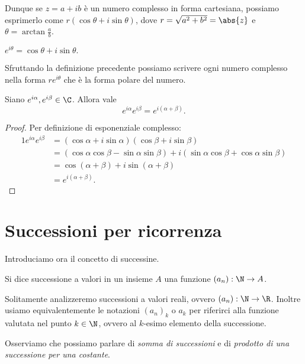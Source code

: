 Dunque se $z = a+ib$ è un numero complesso in forma cartesiana, possiamo esprimerlo come $r(\cos\theta + i\sin\theta)$, dove $r = \sqrt{a^2 + b^2} = \abs{z}$ e $\theta = \arctan \frac{a}{b}$.

\begin{definition}
    $e^{i\theta} = \cos\theta + i\sin\theta.$
\end{definition}

Sfruttando la definizione precedente possiamo scrivere ogni numero complesso nella forma $re^{i\theta}$ che è la forma polare del numero.

\begin{proposition}
    Siano $e^{i\alpha}, e^{i\beta} \in \C$. Allora vale \[
        e^{i\alpha} e^{i\beta} = e^{i(\alpha + \beta)}.
    \]
\end{proposition}
\begin{proof}
    Per definizione di esponenziale complesso:
    \begin{alignat*}{1}
        e^{i\alpha} e^{i\beta} &= (\cos\alpha + i\sin\alpha)(\cos\beta + i\sin\beta)\\
        &= (\cos\alpha \cos\beta - \sin\alpha \sin\beta) + i(\sin\alpha \cos\beta + \cos\alpha \sin\beta)\\
        &= \cos(\alpha + \beta) + i\sin(\alpha + \beta)\\
        &= e^{i(\alpha + \beta)}. \tag*{\qedhere}
    \end{alignat*}
\end{proof}

\section{Successioni per ricorrenza}

Introduciamo ora il concetto di successine.

\begin{definition}[Successione]
    Si dice successione a valori in un insieme $A$ una funzione $(a_n) : \N \to A$.
\end{definition}

Solitamente analizzeremo successioni a valori reali, ovvero $(a_n) : \N \to \R$. Inoltre usiamo equivalentemente le notazioni $(a_n)_k$ o $a_k$ per riferirci alla funzione valutata nel punto $k \in \N$, ovvero al $k$-esimo elemento della successione.

Osserviamo che possiamo parlare di \emph{somma di successioni} e di \emph{prodotto di una successione per una costante}.

